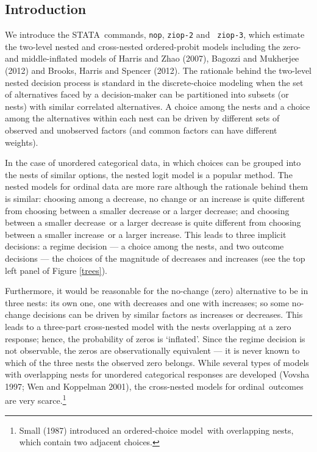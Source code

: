 \documentclass[letterpaper,fleqn,12pt]{article}
\begin{document}
\begin{onehalfspace}%

\section{Introduction}

We introduce the STATA\ commands, \texttt{nop}, \texttt{ziop-2} and \texttt{%
ziop-3}, which estimate the two-level nested and cross-nested ordered-probit
models including the zero- and middle-inflated models of Harris and Zhao
(2007), Bagozzi and Mukherjee (2012) and Brooks, Harris and Spencer (2012).
The rationale behind the two-level nested decision process is standard in
the discrete-choice modeling when the set of alternatives faced by a
decision-maker can be partitioned into subsets (or nests) with similar
correlated alternatives. A choice among the nests and a choice among the
alternatives within each nest can be driven by different sets of observed
and unobserved factors (and common factors can have different weights). 

In the case of unordered categorical data, in which choices can be grouped
into the nests of similar options, the nested logit model is a popular
method. The nested models for ordinal data are more rare although the
rationale behind them is similar: choosing among a decrease, no change or an
increase is quite different from choosing between a smaller decrease or a
larger decrease; and choosing between a smaller decrease\ or a larger
decrease is quite different from choosing between a smaller increase\ or a
larger increase. This leads to three implicit decisions: a regime decision
--- a choice among the nests, and two outcome decisions --- the choices of
the magnitude of decreases and increases (see the top left panel of Figure %
\ref{trees}).

Furthermore, it would be reasonable for the no-change (zero) alternative to
be in three nests: its own one, one with decreases and one with increases;
so some no-change decisions can be driven by similar factors as increases or
decreases. This leads to a three-part cross-nested model with the nests
overlapping at a zero response; hence, the probability of zeros is
`inflated'. Since the regime decision is not observable, the zeros are
observationally equivalent --- it is never known to which of the three nests
the observed zero belongs. While several types of models with overlapping
nests for unordered categorical responses are developed (Vovsha 1997; Wen
and Koppelman 2001), the cross-nested models for ordinal\ outcomes are very
scarce.\footnote{%
Small (1987) introduced an ordered-choice model\ with overlapping nests,
which contain two adjacent choices.}


\end{onehalfspace}
\end{document}
